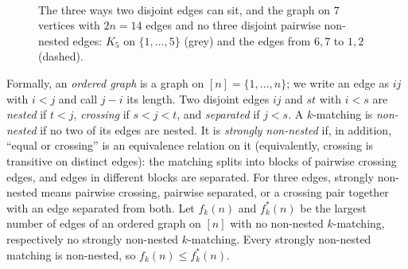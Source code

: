 \documentclass[11pt]{amsart}
\theoremstyle{definition}\newtheorem{problem}{Problem}
\theoremstyle{remark}\newtheorem*{remark}{Remark}
\begin{document}
\begin{figure}[ht]
\centering
{}\\[4pt]
\caption{The three ways two disjoint edges can sit, and the graph on $7$ vertices with $2n=14$ edges and no three
disjoint pairwise non-nested edges: $K_5$ on $\{1,\dots,5\}$ (grey) and the edges from $6,7$ to $1,2$ (dashed).}
\label{fig:patterns}
\end{figure}

Formally, an \emph{ordered graph} is a graph on $[n]=\{1,\dots,n\}$; we write an edge as $ij$ with $i<j$ and call
$j-i$ its length. Two disjoint edges $ij$ and $st$ with $i<s$ are \emph{nested} if $t<j$, \emph{crossing} if
$s<j<t$, and \emph{separated} if $j<s$. A $k$-matching is \emph{non-nested} if no two of its edges are nested. It is
\emph{strongly non-nested} if, in addition, ``equal or crossing'' is an equivalence relation on it (equivalently,
crossing is transitive on distinct edges): the matching splits into blocks
of pairwise crossing edges, and edges in different blocks are separated. For three edges, strongly non-nested means
pairwise crossing, pairwise separated, or a crossing pair together with an edge separated from both. Let $f_k(n)$ and
$f^*_k(n)$ be the largest number of edges of an ordered graph on $[n]$ with no non-nested $k$-matching, respectively
no strongly non-nested $k$-matching. Every strongly non-nested matching is non-nested, so $f_k(n)\le f_k^*(n)$.
\end{document}
